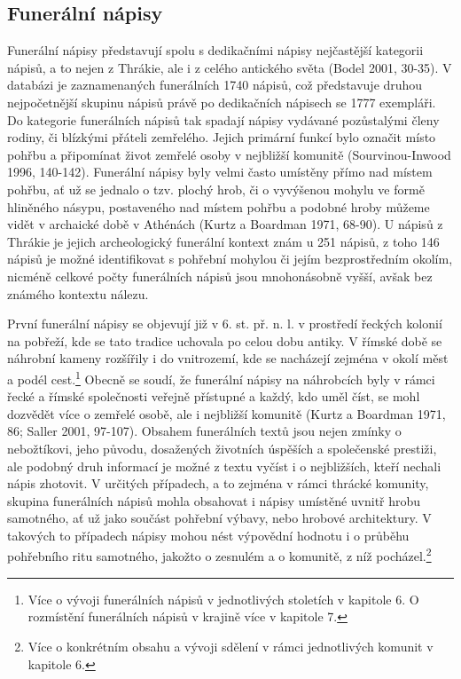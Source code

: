 \subsection[funerální-nápisy]{Funerální nápisy}

Funerální nápisy představují spolu s dedikačními nápisy nejčastější kategorii nápisů, a to nejen z Thrákie, ale i z celého antického světa (Bodel 2001, 30-35). V databázi je zaznamenaných funerálních 1740 nápisů, což představuje druhou nejpočetnější skupinu nápisů právě po dedikačních nápisech se 1777 exempláři. Do kategorie funerálních nápisů tak spadají nápisy vydávané pozůstalými členy rodiny, či blízkými přáteli zemřelého. Jejich primární funkcí bylo označit místo pohřbu a připomínat život zemřelé osoby v nejbližší komunitě (Sourvinou-Inwood 1996, 140-142). Funerální nápisy byly velmi často umístěny přímo nad místem pohřbu, ať už se jednalo o tzv. plochý hrob, či o vyvýšenou mohylu ve formě hliněného násypu, postaveného nad místem pohřbu a podobné hroby můžeme vidět v archaické době v Athénách (Kurtz a Boardman 1971, 68-90). U nápisů z Thrákie je jejich archeologický funerální kontext znám u 251 nápisů, z toho 146 nápisů je možné identifikovat s pohřební mohylou či jejím bezprostředním okolím, nicméně celkové počty funerálních nápisů jsou mnohonásobně vyšší, avšak bez známého kontextu nálezu.

První funerální nápisy se objevují již v 6. st. př. n. l. v prostředí řeckých kolonií na pobřeží, kde se tato tradice uchovala po celou dobu antiky. V římské době se náhrobní kameny rozšířily i do vnitrozemí, kde se nacházejí zejména v okolí měst a podél cest.\footnote{Více o vývoji funerálních nápisů v jednotlivých stoletích v kapitole 6. O rozmístění funerálních nápisů v krajině více v kapitole 7.} Obecně se soudí, že funerální nápisy na náhrobcích byly v rámci řecké a římské společnosti veřejně přístupné a každý, kdo uměl číst, se mohl dozvědět více o zemřelé osobě, ale i nejbližší komunitě (Kurtz a Boardman 1971, 86; Saller 2001, 97-107). Obsahem funerálních textů jsou nejen zmínky o nebožtíkovi, jeho původu, dosažených životních úspěších a společenské prestiži, ale podobný druh informací je možné z textu vyčíst i o nejbližších, kteří nechali nápis zhotovit. V určitých případech, a to zejména v rámci thrácké komunity, skupina funerálních nápisů mohla obsahovat i nápisy umístěné uvnitř hrobu samotného, ať už jako součást pohřební výbavy, nebo hrobové architektury. V takových to případech nápisy mohou nést výpovědní hodnotu i o průběhu pohřebního ritu samotného, jakožto o zesnulém a o komunitě, z níž pocházel.\footnote{Více o konkrétním obsahu a vývoji sdělení v rámci jednotlivých komunit v kapitole 6.}


